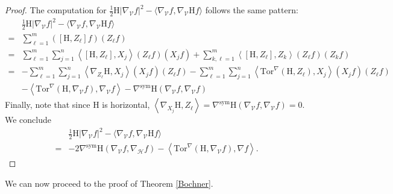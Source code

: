 \documentclass[11pt]{article}
\numberwithin{equation}{section}
\newcommand{\Ho}{\mathcal H}
\newcommand{\V}{\mathcal V}
\newcommand{\Tor}{\mathrm{Tor}}
\begin{document}
\begin{proof}
The computation for $\frac{1}{2}\mathrm H | \nabla_\V f|^2-\langle \nabla_{\mathcal{V}} f , \nabla_{\mathcal{V}}\mathrm H f \rangle$ follows the same pattern:
\begin{align*}
& \frac{1}{2}\mathrm H | \nabla_\V f|^2-\langle \nabla_{\mathcal{V}} f , \nabla_{\mathcal{V}}\mathrm H f \rangle \\
=&\sum_{\ell=1}^m ([\mathrm H,Z_\ell]f)(Z_\ell f) \\
=&\sum_{\ell=1}^m \sum_{j=1}^n \left\langle [\mathrm H,Z_\ell],X_j \right\rangle (Z_\ell f) (X_j f)+\sum_{k,\ell=1}^m  \left\langle [\mathrm H,Z_\ell],Z_k \right\rangle (Z_\ell f)(Z_k f)\\
=&-\sum_{\ell=1}^m \sum_{j=1}^n \left\langle \nabla_{Z_\ell} \mathrm H,X_j \right\rangle (X_j f)(Z_\ell f)-\sum_{\ell=1}^m \sum_{j=1}^n \left\langle \Tor^\nabla( \mathrm H,Z_\ell),X_j \right\rangle (X_j f)(Z_\ell f)  \\
 &-\left\langle \mathrm{Tor}^\nabla (\mathrm H, \nabla_\V f), \nabla_\V f \right\rangle- \nabla^{\mathrm{sym}}\mathrm H(\nabla_\V f,\nabla_\V f) 
\end{align*}
Finally, note that since $\mathrm H$ is horizontal, $\left\langle \nabla_{X_j} \mathrm H, Z_\ell\right\rangle =\nabla^{\mathrm{sym}}\mathrm H(\nabla_\V f,\nabla_\V f)=0$. We conclude
\begin{align*}
& \frac{1}{2}\mathrm H | \nabla_\V f|^2-\langle \nabla_{\mathcal{V}} f , \nabla_{\mathcal{V}}\mathrm H f \rangle \\
   =&-2\nabla^{\mathrm{sym}}\mathrm H(\nabla_\V f,\nabla_\Ho f)-\left\langle \mathrm{Tor}^\nabla (\mathrm H, \nabla_\V f), \nabla f \right\rangle.
\end{align*}
    \end{proof}
	We can now proceed to the proof of Theorem \ref{Bochner}.
	
\end{document}
